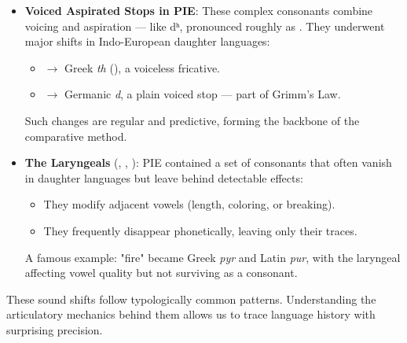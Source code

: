 \begin{tcolorbox}
\begin{itemize}[leftmargin=*]
\item \textbf{Voiced Aspirated Stops in PIE}: These complex consonants combine voicing and aspiration — like {\piefont *dʰ}, pronounced roughly as {\ipafont [dʱ]}. They underwent major shifts in Indo-European daughter languages:
  \begin{itemize}
    \item {} $\rightarrow$ Greek \emph{th} ({\ipafont [θ]}), a voiceless fricative.
    \item {} $\rightarrow$ Germanic \emph{d}, a plain voiced stop — part of Grimm's Law.
  \end{itemize}
Such changes are regular and predictive, forming the backbone of the comparative method.

\item \textbf{The Laryngeals} (, , ): PIE contained a set of consonants that often vanish in daughter languages but leave behind detectable effects:
  \begin{itemize}
    \item They modify adjacent vowels (length, coloring, or breaking).
    \item They frequently disappear phonetically, leaving only their traces.
  \end{itemize}
A famous example:  "fire" became Greek \emph{pyr} and Latin \emph{pur}, with the laryngeal affecting vowel quality but not surviving as a consonant.

\end{itemize}

\medskip

These sound shifts follow typologically common patterns. Understanding the articulatory mechanics behind them allows us to trace language history with surprising precision.
\end{tcolorbox}

